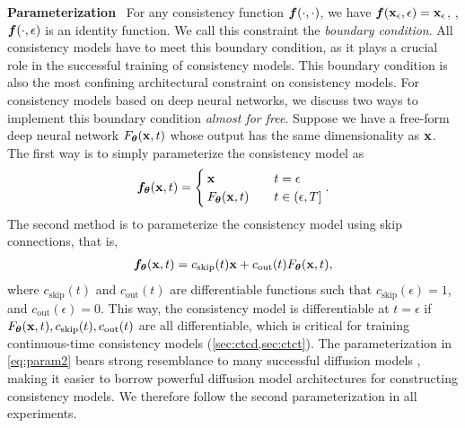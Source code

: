 \textbf{Parameterization}~ For any consistency function ${\bm{f}}(\cdot, \cdot)$, we have ${\bm{f}}({\mathbf{x}}_\epsilon, \epsilon) = {\mathbf{x}}_\epsilon$, \ie, ${\bm{f}}(\cdot, \epsilon)$ is an identity function. We call this constraint the \emph{boundary condition}. All consistency models have to meet this boundary condition, as it plays a crucial role in the successful training of consistency models. This boundary condition is also the most confining architectural constraint on consistency models. For consistency models based on deep neural networks, we discuss two ways to implement this boundary condition \emph{almost for free}. Suppose we have a free-form deep neural network $F_{\bm{\theta}}({\mathbf{x}}, t)$ whose output has the same dimensionality as ${\mathbf{x}}$. The first way is to simply parameterize the consistency model as
\begin{align}
    {\bm{f}}_{\bm{\theta}}({\mathbf{x}}, t) = \begin{cases}
        {\mathbf{x}} &\quad t = \epsilon\\
        F_{\bm{\theta}}({\mathbf{x}}, t) &\quad t \in (\epsilon, T]
    \end{cases}\label{eq:param1}.
\end{align}
The second method is to parameterize the consistency model using skip connections, that is,
\begin{align}
    {\bm{f}}_{\bm{\theta}}({\mathbf{x}}, t) = c_\text{skip}(t) {\mathbf{x}} + c_\text{out}(t) F_{\bm{\theta}}({\mathbf{x}}, t)\label{eq:param2},
\end{align}
where $c_\text{skip}(t)$ and $c_\text{out}(t)$ are differentiable functions such that $c_\text{skip}(\epsilon) = 1$, and $c_\text{out}(\epsilon) = 0$. This way, the consistency model is differentiable at $t = \epsilon$ if $F_{\bm{\theta}}({\mathbf{x}}, t), c_\text{skip}(t), c_\text{out}(t)$ are all differentiable, which is critical for training continuous-time consistency models (\cref{sec:ctcd,sec:ctct}). %
The parameterization in \cref{eq:param2} bears strong resemblance to many successful diffusion models \cite{karras2022edm,balaji2022eDiff-I}, making it easier to borrow powerful diffusion model architectures for constructing consistency models. We therefore follow the second parameterization in all experiments.

